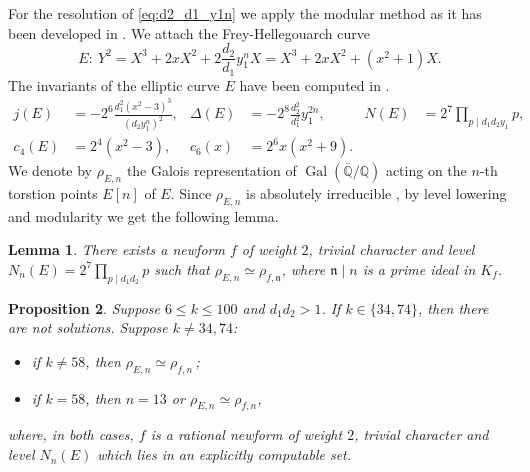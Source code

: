\documentclass[12pt]{amsart}
\numberwithin{equation}{section}
\newtheorem{lemma}{Lemma}[section]
\newtheorem{proposition}[lemma]{Proposition}
\theoremstyle{definition}
\theoremstyle{remark}
\newcommand{\QQ}{\mathbb{Q}}
\newcommand{\fn}{\mathfrak{n}}
\newcommand{\rhoE}{\rho_{E,n}}
\newcommand{\rhof}{\rho_{f,\fn}}
\newcommand{\rhofn}{\rho_{f,n}}
\DeclareMathOperator{\Gal}{Gal}
\begin{document}
For the resolution of \eqref{eq:d2_d1_y1n} we apply the modular method as it has been developed in \cite{BennettSkinner04}. We attach the Frey-Hellegouarch curve
\begin{equation*}
    E:~Y^2=X^3 + 2xX^2 + 2\frac{d_2}{d_1}y_1^nX=X^3 + 2xX^2 + (x^2 + 1)X.
\end{equation*}
The invariants of the elliptic curve $E$ have been computed in \cite[Lemma 2.1]{BennettSkinner04}.
\begin{equation*}
\begin{aligned}
    j(E) & =-2^6\frac{d_1^2(x^2 - 3)^3}{(d_2y_1^n)^2}, & \Delta(E)& = -2^8\frac{d_2^2}{d_1^2}y_1^{2n}, &  
    N(E)& =2^7\prod_{p\mid d_1d_2y_1}\!\!p,\\
    c_4(E) & = 2^4(x^2 - 3), &  c_6(x) &= 2^6x(x^2 + 9).
\end{aligned}
\end{equation*}
We denote by $\rhoE$ the Galois representation of $\Gal(\bar{\QQ}/\QQ)$ acting 
on the $n$-th torstion points $E[n]$ of $E$. Since $\rhoE$ is absolutely 
irreducible \cite[Corollary 3.1]{BennettSkinner04}, by level lowering 
\cite{Ribet90} and modularity 
\cite{Wiles95, TaylorWiles95, BreuilConradDiamondTaylor01} 
we get the following lemma.

\begin{lemma}\label{lem:newform_isomorphism}
There exists a newform $f$ of weight $2$, trivial character and level $N_n(E)=2^7\prod_{p\mid d_1d_2}p$ such that $\rhoE\simeq\rhof$, where $\fn\mid n$ is a prime ideal in $K_f$.
\end{lemma}

\begin{proposition}\label{prop:modular_method_k}
Suppose $6\leq k\leq 100$ and $d_1d_2>1$. If $k\in\{34,74\}$, then there are not solutions. Suppose $k\neq 34, 74$:
\begin{itemize}
    \item if $k\neq 58$, then $\rhoE\simeq\rhofn$\,;
    \item if $k=58$, then $n=13$ or $\rhoE\simeq\rhofn$, 
\end{itemize}
where, in both cases, $f$ is a rational newform of weight $2$, trivial 
character and level $N_n(E)$ which lies in an explicitly computable set.
\end{proposition}
\end{document}
